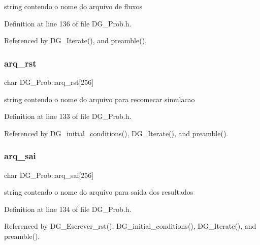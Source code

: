 string contendo o nome do arquivo de fluxos 



Definition at line 136 of file D\+G\+\_\+\+Prob.\+h.



Referenced by D\+G\+\_\+\+Iterate(), and preamble().

\mbox{\label{classDG__Prob_a09bc7ed787088a22a4e0707550d747a4}} 
\subsubsection{\texorpdfstring{arq\+\_\+rst}{arq\_rst}}
{\footnotesize\ttfamily char D\+G\+\_\+\+Prob\+::arq\+\_\+rst\mbox{[}256\mbox{]}\hspace{0.3cm}{\ttfamily [private]}}



string contendo o nome do arquivo para recomecar simulacao 



Definition at line 133 of file D\+G\+\_\+\+Prob.\+h.



Referenced by D\+G\+\_\+initial\+\_\+conditions(), D\+G\+\_\+\+Iterate(), and preamble().

\mbox{\label{classDG__Prob_a5c02458978efbc0a34e34e0d7f98290b}} 
\subsubsection{\texorpdfstring{arq\+\_\+sai}{arq\_sai}}
{\footnotesize\ttfamily char D\+G\+\_\+\+Prob\+::arq\+\_\+sai\mbox{[}256\mbox{]}\hspace{0.3cm}{\ttfamily [private]}}



string contendo o nome do arquivo para saida dos resultados 



Definition at line 134 of file D\+G\+\_\+\+Prob.\+h.



Referenced by D\+G\+\_\+\+Escrever\+\_\+rst(), D\+G\+\_\+initial\+\_\+conditions(), D\+G\+\_\+\+Iterate(), and preamble().

